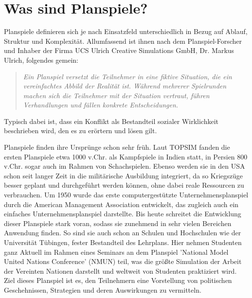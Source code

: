 \section{Was sind Planspiele?}
\label{sec:einleitung-was}

Planspiele definieren sich je nach Einsatzfeld unterschiedlich in Bezug auf Ablauf, Struktur und Komplexität. Allumfassend ist ihnen nach dem Planspiel-Forscher und Inhaber der Firma UCS Ulrich Creative Simulations GmbH, Dr. Markus Ulrich, folgendes gemein:

\begin{quotation}
\itshape
Ein Planspiel versetzt die Teilnehmer in eine fiktive Situation, die ein vereinfachtes Abbild der Realität ist. Während mehrerer Spielrunden machen sich die Teilnehmer mit der Situation vertraut, führen Verhandlungen und fällen konkrete Entscheidungen. 
\end{quotation}

Typisch dabei ist, dass ein Konflikt als Bestandteil sozialer Wirklichkeit beschrieben wird, den es zu erörtern und lösen gilt.

Planspiele finden ihre Ursprünge schon sehr früh. Laut TOPSIM fanden die ersten Planspiele etwa 1000 v.Chr. als Kampfspiele in Indien statt, in Persien 800 v.Chr. sogar auch im Rahmen von Schachspielen.  Ebenso werden sie in den USA schon seit langer Zeit in die militärische Ausbildung integriert, da so Kriegszüge besser geplant und durchgeführt werden können, ohne dabei reale Ressourcen zu verbrauchen. Um 1950 wurde das  erste computergestützte Unternehmensplanspiel durch die American Management Association entwickelt, das zugleich auch ein einfaches Unternehmensplanspiel darstellte. Bis heute schreitet die Entwicklung dieser Planspiele stark voran, sodass sie zunehmend in sehr vielen Bereichen Anwendung finden. So sind sie auch schon an Schulen und Hochschulen wie der Universität Tübingen, fester Bestandteil des Lehrplans. Hier nehmen Studenten ganz Aktuell im Rahmen eines Seminars an dem Planspiel 'National Model United Nations Conference' (NMUN) teil, was die größte Simulation der Arbeit der Vereinten Nationen darstellt und weltweit von Studenten praktiziert wird. Ziel dieses Planspiel ist es, den Teilnehmern eine Vorstellung von politischen Geschehnissen, Strategien und deren Auswirkungen zu vermitteln.

